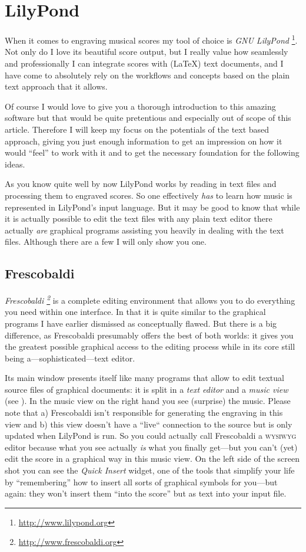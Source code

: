 \documentclass[DIV=12]{scrreprt}
\begin{document}
\chapter{LilyPond}
\label{chap:pt_lilypond}
When it comes to engraving musical scores my tool of choice is \emph{GNU LilyPond}%
\footnote{\url{http://www.lilypond.org}}.
Not only do I love its beautiful score output, but I really value how seamlessly and professionally I can integrate scores with (\LaTeX) text documents, and I have come to absolutely rely on the workflows and concepts based on the plain text approach that it allows.

Of course I would love to give you a thorough introduction to this amazing software but that would be quite pretentious and especially out of scope of this article.
Therefore I will keep my focus on the potentials of the text based approach, giving you just enough information to get an impression on how it would “feel” to work with it and to get the necessary foundation for the following ideas.

As you know quite well by now LilyPond works by reading in text files and processing them to engraved scores.
So one effectively \emph{has} to learn how music is represented in LilyPond's input language.
But it may be good to know that while it is actually possible to edit the text files with any plain text editor there actually \emph{are} graphical programs assisting you heavily in dealing with the text files.
Although there are a few I will only show you one.

\section{Frescobaldi}
\label{sec:pt_frescobaldi}

\textit{Frescobaldi%
\footnote{\url{http://www.frescobaldi.org}}}
is a complete editing environment that allows you to do everything you need within one interface.
In that it is quite similar to the graphical programs I have earlier dismissed as conceptually flawed.
But there is a big difference, as Frescobaldi presumably offers the best of both worlds:
it gives you the greatest possible graphical access to the editing process while in its core still being a---sophisticated---text editor.

Its main window presents itself like many programs that allow to edit textual source files of graphical documents: it is split in a \emph{text editor} and a \emph{music view} (see ).
In the music view on the right hand you see (surprise) the music.
Please note that a) Frescobaldi isn't responsible for generating the engraving in this view and b) this view doesn't have a  “live“ connection to the source but is only updated when LilyPond is run.
So you could actually call Frescobaldi a \textsc{wysiwyg} editor because what you see actually \emph{is} what you finally get---but you can't (yet) edit the score in a graphical way in this music view.
On the left side of the screen shot you can see the \emph{Quick Insert} widget, one of the tools that simplify your life by “remembering” how to insert all sorts of graphical symbols for you---but again: they won't insert them “into the score” but as text into your input file.
\end{document}
